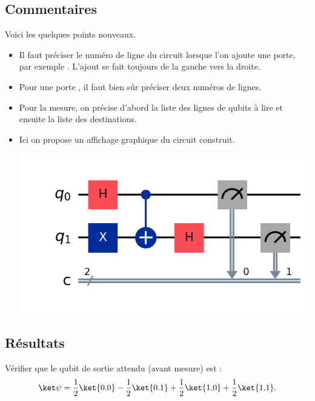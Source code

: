 \documentclass[11pt,class=report,crop=false]{standalone}
\begin{document}
\subsection{Commentaires}

Voici les quelques points nouveaux.
\begin{itemize}
  \item Il faut préciser le numéro de ligne du circuit lorsque l'on ajoute une porte, par exemple . L'ajout se fait toujours de la gauche vers la droite.
  \item Pour une porte , il faut bien sûr préciser deux numéros de lignes.
  \item Pour la mesure, on précise d'abord la liste des lignes de qubits à lire et ensuite la liste des destinations.
  \item Ici on propose un affichage graphique du circuit construit. 
  
  \medskip
  
\begin{center}
\includegraphics[scale=\myscale,scale=0.6]{figures/fig-circuit-mpl}
\end{center}

\end{itemize}  

\subsection{Résultats}


Vérifier que le qubit de sortie attendu (avant mesure) est :
$$\ket\psi = \frac12\ket{0.0}-\frac12\ket{0.1}+\frac12\ket{1.0}+\frac12\ket{1.1}.$$
\end{document}

